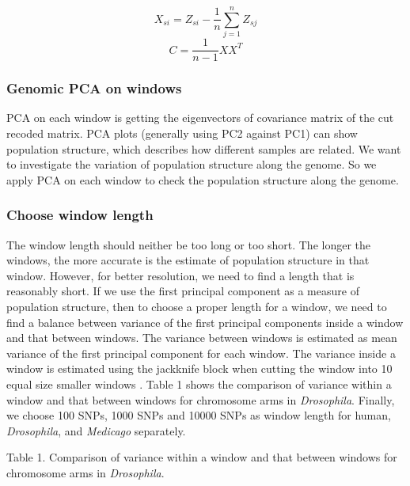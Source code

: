 \documentclass[11pt, oneside]{article}   	%
\begin{document}
\begin{equation}
X_{si}=Z_{si}-\frac{1}{n}\sum_{j=1}^{n}Z_{sj} 
\end{equation}
\begin{equation}
C=\frac{1}{n-1}XX^{T}
\end{equation}

\subsubsection{Genomic PCA on windows}
PCA on each window is getting the eigenvectors of covariance matrix of the cut recoded matrix. PCA plots (generally using PC2 against PC1) can show population structure, which describes how different samples are related. We want to investigate the variation of population structure along the genome. So we apply PCA on each window to check the population structure along the genome.
\subsubsection{Choose window length}
The window length should neither be too long or too short. The longer the windows, the more accurate is the estimate of population structure in that window. However, for better resolution, we need to find a length that is reasonably short. If we use the first principal component as a measure of population structure, then to choose a proper length for a
window, we need to find a balance between variance of the first principal components inside a window and that between windows. The variance between windows is estimated as mean variance of the first principal component for each window. The variance inside a window is estimated using the jackknife block when cutting the window into 10 equal size smaller windows \cite{efron1982jackknife}. Table 1 shows the comparison of variance within a window and that between windows for chromosome arms in \textit{Drosophila}. Finally, we choose 100 SNPs, 1000 SNPs and 10000 SNPs as window length for human, \textit{Drosophila}, and \textit{Medicago} separately.


\noindent Table 1. Comparison of variance within a window and that between windows for chromosome arms in \textit{Drosophila}.
\end{document}

